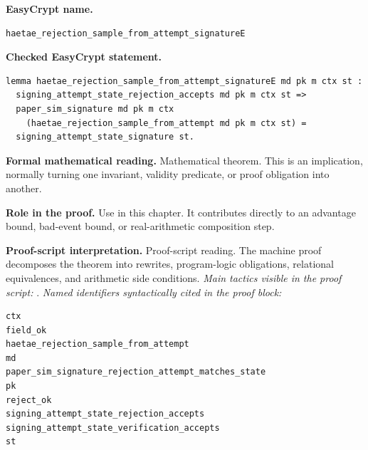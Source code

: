 \begin{formaltheorem}
\noindent\textbf{EasyCrypt name.}
\begin{lstlisting}[language=EasyCrypt,basicstyle=\ttfamily\scriptsize]
haetae_rejection_sample_from_attempt_signatureE
\end{lstlisting}
\noindent\textbf{Checked EasyCrypt statement.}
\begin{lstlisting}[language=EasyCrypt,basicstyle=\ttfamily\scriptsize]
lemma haetae_rejection_sample_from_attempt_signatureE md pk m ctx st :
  signing_attempt_state_rejection_accepts md pk m ctx st =>
  paper_sim_signature md pk m ctx
    (haetae_rejection_sample_from_attempt md pk m ctx st) =
  signing_attempt_state_signature st.
\end{lstlisting}
\noindent\textbf{Formal mathematical reading.}
Mathematical theorem. This is an implication, normally turning one invariant, validity predicate, or proof obligation into another.

\noindent\textbf{Role in the proof.}
Use in this chapter. It contributes directly to an advantage bound, bad-event bound, or real-arithmetic composition step.

\noindent\textbf{Proof-script interpretation.}
Proof-script reading. The machine proof decomposes the theorem into rewrites, program-logic obligations, relational equivalences, and arithmetic side conditions.
\emph{Main tactics visible in the proof script:} .
\emph{Named identifiers syntactically cited in the proof block:}
\begin{lstlisting}[language=EasyCrypt,basicstyle=\ttfamily\scriptsize]
ctx
field_ok
haetae_rejection_sample_from_attempt
md
paper_sim_signature_rejection_attempt_matches_state
pk
reject_ok
signing_attempt_state_rejection_accepts
signing_attempt_state_verification_accepts
st
\end{lstlisting}

\end{formaltheorem}

